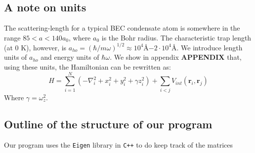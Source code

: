 \documentclass[a4paper, 10pt]{article}
\begin{document}
\subsection{A note on units}
The scattering-length for a typical BEC condensate atom is somewhere in the range $85<a<140a_0$, where $a_0$ is the Bohr radius. The characteristic trap length (at 0 K), however, is $a_{ho}=(\hbar/m\omega)^{1/2}\approx 10^{4}$Å$-2\cdot 10^{4}$Å. We introduce length units of $a_{ho}$ and energy units of $\hbar \omega$. We show in appendix \textbf{APPENDIX} that, using these units, the Hamiltonian can be rewritten as:
\begin{equation}\label{eq:Hamiltonian_dimensionless}
H=\sum_{i=1}^N\left(-\nabla_i^2 + x_i^2+y_i^2+\gamma z_i^2\right)+\sum_{i<j}V_{int}(\boldsymbol{r}_i, \boldsymbol{r}_j)
\end{equation}
Where $\gamma=\omega_z^2$.



\subsection{Outline of the structure of our program}
Our program uses the \texttt{Eigen} library in \texttt{C++} to do keep track of the matrices  
\end{document}

